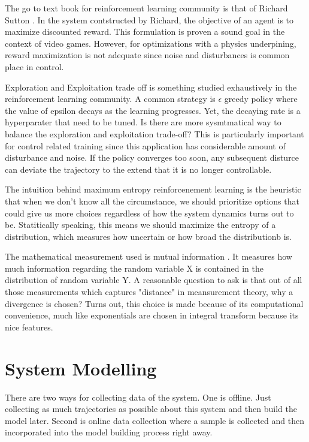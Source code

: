 \documentclass[journal]{IEEEtran}
\begin{document}
The go to text book for reinforcement learning community is that of Richard Sutton \cite{Sutton1998IntroductionTR}. In the system contstructed by Richard, the objective of an agent is to maximize discounted reward. This formulation is proven a sound goal in the context of video games. However, for optimizations with a physics underpining, reward maximization is not adequate since noise and disturbances is common place in control.

Exploration and Exploitation trade off is something studied exhaustively in the reinforcement learning community. A common strategy is $\epsilon$ greedy policy where the value of epsilon decays as the learning progresses. Yet, the decaying rate is a hyperparater that need to be tuned. Is there are more sysmtmatical way to balance the exploration and exploitation trade-off? This is particularly important for control related training since this application has considerable amount of disturbance and noise. If the policy converges too soon, any subsequent disturce can deviate the trajectory to the extend that it is no longer controllable.

The intuition behind maximum entropy reinforcenement learning is the heuristic that when we don't know all the circumstance, we should prioritize options that could give us more choices regardless of how the system dynamics turns out to be. Statitically speaking, this means we should maximize the entropy of a distribution, which measures how uncertain or how broad the distributionb is.

The mathematical measurement used is mutual information \cite{Kullback1951ONIA}. It measures how much information regarding the random variable X is contained in the distribution of random variable Y. A reasonable question to ask is that out of all those measurements which captures "distance" in meansurement theory, why a divergence is chosen? Turns out, this choice is made because of its computational convenience, much like exponentials are chosen in integral transform because its nice features.



\section{System Modelling}

There are two ways for collecting data of the system. One is offline. Just collecting as much trajectories as possible about this system and then build the model later. Second is online data collection where a sample is collected and then incorporated into the model building process right away.
\end{document}

